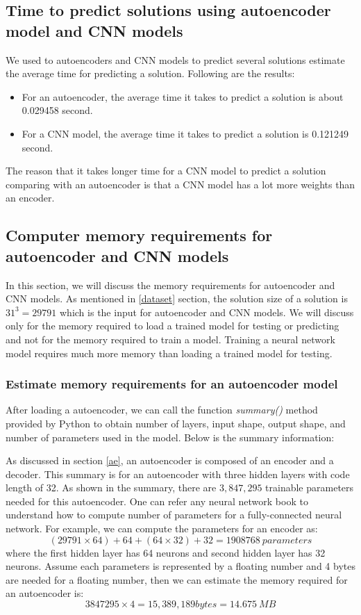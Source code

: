 \documentclass{article}
\begin{document}
\subsection{Time to predict solutions using autoencoder model and CNN models}
We used to autoencoders and CNN models to predict several solutions estimate the average time for predicting a solution. Following are the results:
\begin{itemize}
	\item For an autoencoder, the average time it takes to predict a solution is about 0.029458 second.
	\item For a CNN model, the average time it takes to predict a solution is 0.121249 second. 	
\end{itemize}
The reason that it takes longer time for a CNN model to predict a solution comparing with an autoencoder is that a CNN model has a lot more weights than an encoder.

\subsection{Computer memory requirements for autoencoder and CNN models}
In this section, we will discuss the memory requirements for autoencoder and CNN models. As mentioned in \ref{dataset} section, the solution size of a solution is $31^3 = 29791$ which is the input for autoencoder and CNN models. We will discuss only for the memory required to load a trained model for testing or predicting and not for the memory required to train a model. Training a neural network model requires much more memory than loading a trained model for testing.

\subsubsection{Estimate memory requirements for an autoencoder model}
After loading a autoencoder, we can call the function \emph{summary()} method provided by Python to obtain number of layers, input shape, output shape, and number of parameters used in the model. Below is the summary information:


As discussed in section \ref{ae}, an autoencoder is composed of an encoder and a decoder. This summary is for an autoencoder with three hidden layers with code length of 32. As shown in the summary, there are $3,847,295$ trainable parameters needed for this autoencoder. One can refer any neural network book to understand how to compute number of parameters for a fully-connected neural network. For example, we can compute the parameters for an encoder as:
\[
(29791 \times 64) + 64 + (64 \times 32) + 32 = 1908768 \ parameters
\]
where the first hidden layer has 64 neurons and second hidden layer has 32 neurons.
Assume each parameters is represented by a floating number and 4 bytes are needed for a floating number, then we can estimate the  memory required for an autoencoder is:
\[ 3847295 \times 4 = 15,389,189 bytes = 14.675 \ MB \]
\end{document}

